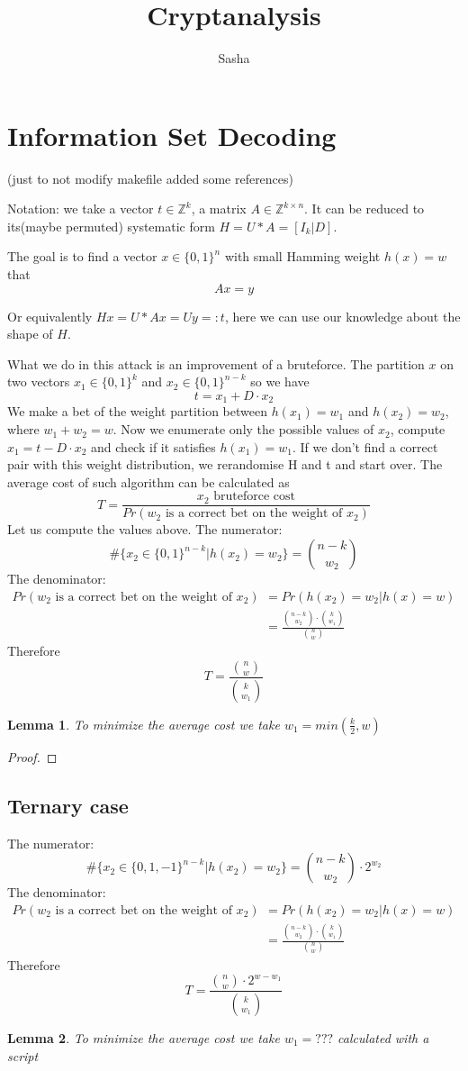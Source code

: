 \documentclass[12pt]{article}
\title{Cryptanalysis}
\author{ Sasha }
\newcommand{\ZZ}{\mathbb{Z}}
\newtheorem{lemma}{Lemma}
\begin{document}
\maketitle

\section{Information Set Decoding}

\cite{[DP19]}(just to not modify makefile added some references)

Notation: we take a vector $t \in \ZZ^{k}$, a matrix $A \in \ZZ^{k \times n}$. It can be reduced to its(maybe permuted) systematic form $H  = U * A = [I_{k}|D]$.


The goal is to find a vector $x \in \{0,1\}^{n}$ with small Hamming weight $h(x) = w$ that
\[
Ax = y
\]

Or equivalently $Hx = U*Ax = Uy =: t$, here we can use our knowledge about the shape of $H$.

What we do in this attack is an improvement of a bruteforce. The partition $x$ on two vectors $x_1 \in \{0,1\}^{k}$ and  $x_2  \in \{0,1\}^{n-k}$ so we have
\[
t = x_1 + D \cdot x_2
\]
We make a bet of the weight partition between $h(x_1) = w_1$ and $h(x_2) = w_2$, where $w_1 + w_2 = w$. Now we enumerate only the possible values of $x_2$, compute $x_1 = t - D \cdot x_2$ and check if it satisfies $h(x_1) = w_1$. If we don't find a correct pair with this weight distribution, we rerandomise H and t and start over. The average cost of such algorithm can be calculated as
\[
T = \frac{x_2\text{ bruteforce cost}}{Pr(w_2\text{ is a correct bet on the weight of }x_2)}
\]
Let us compute the values above.
The numerator:
\[
\#\{x_2 \in \{0,1\}^{n-k} | h(x_2) = w_2\} = \binom{n-k}{w_2}
\]
The denominator:
\[
\begin{split}
    Pr(w_2\text{ is a correct bet on the weight of }x_2) & = Pr(h(x_2) = w_2|h(x) = w) \\
    & = \frac{\binom{n-k}{w_2} \cdot \binom{k}{w_1}}{\binom{n}{w}}
\end{split}
\]
Therefore
\[
T = \frac{\binom{n}{w}}{\binom{k}{w_1}}
\]
\begin{lemma}
To minimize the average cost we take $w_1 = min(\frac{k}{2}, w)$
\end{lemma}
\begin{proof}

\end{proof}
\subsection{Ternary case}
The numerator:
\[
\#\{x_2 \in \{0,1,-1\}^{n-k} | h(x_2) = w_2\} = \binom{n-k}{w_2}\cdot 2^{w_2}
\]
The denominator:
\[
\begin{split}
    Pr(w_2\text{ is a correct bet on the weight of }x_2) & = Pr(h(x_2) = w_2|h(x) = w) \\
    & = \frac{\binom{n-k}{w_2} \cdot \binom{k}{w_1}}{\binom{n}{w}}
\end{split}
\]
Therefore
\[
T = \frac{\binom{n}{w} \cdot 2^{w - w_1}}{\binom{k}{w_1}}
\]
\begin{lemma}
To minimize the average cost we take $w_1 = ???$ calculated with a script
\end{lemma}
\end{document}
